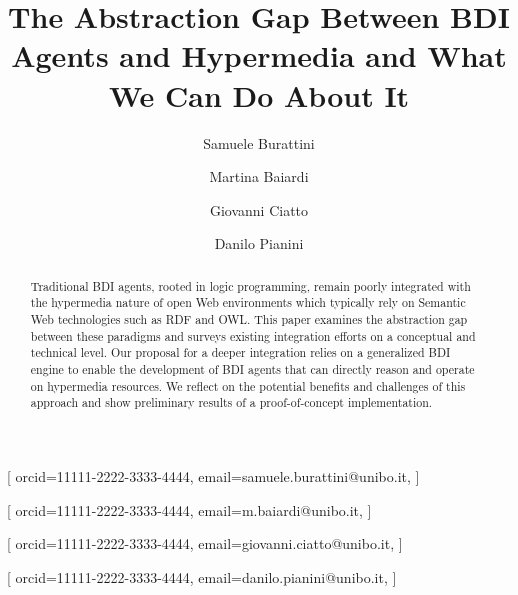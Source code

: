 \documentclass[
]{ceurart}
\begin{document}


\title{The Abstraction Gap Between BDI Agents and Hypermedia and What We Can Do About It}


\author[1]{Samuele Burattini}[%
orcid=11111-2222-3333-4444,
email=samuele.burattini@unibo.it,
]
\cormark[1]
\fnmark[1]

\author[1]{Martina Baiardi}[%
orcid=11111-2222-3333-4444,
email=m.baiardi@unibo.it,
]
\fnmark[1]

\author[1]{Giovanni Ciatto}[%
orcid=11111-2222-3333-4444,
email=giovanni.ciatto@unibo.it,
]


\author[1]{Danilo Pianini}[%
orcid=11111-2222-3333-4444,
email=danilo.pianini@unibo.it,
]



\address[1]{\disi, \unibo}



\begin{abstract}
  Traditional BDI agents, 
  rooted in logic programming, 
  remain poorly integrated with the hypermedia nature of open Web environments
  which typically rely on Semantic Web technologies such as RDF and OWL.
  This paper examines the abstraction gap between these paradigms and surveys existing integration efforts on a conceptual and technical level.
  Our proposal for a deeper integration relies on a generalized BDI engine to enable the development of BDI agents that can directly reason and operate on hypermedia resources.
  We reflect on the potential benefits and challenges of this approach and show preliminary results of a proof-of-concept implementation.
\end{abstract}
\end{document}
